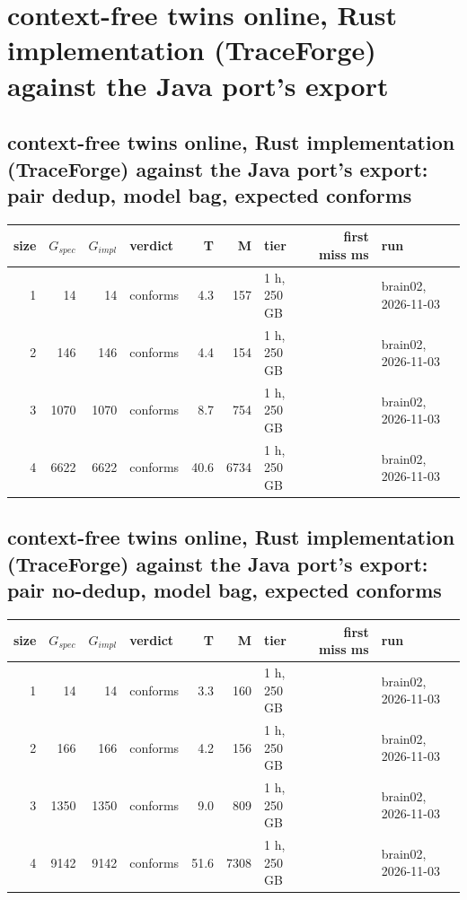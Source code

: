 \documentclass[10pt]{article}
\begin{document}
\section*{context-free twins online, Rust implementation (TraceForge) against the Java port's export}
\subsection*{context-free twins online, Rust implementation (TraceForge) against the Java port's export: pair \textsf{dedup}, model bag, expected conforms}
\begin{longtable}{@{}rrrlrrlrl@{}}
\toprule
size & $G_{\mathit{spec}}$ & $G_{\mathit{impl}}$ & verdict & T & M & tier & first miss ms & run \\
\midrule
\endhead
\color{red} 1 & 14 & 14 & conforms & 4.3 & 157 & 1 h, 250 GB &  & brain02, 2026-11-03 \\
\color{red} 2 & 146 & 146 & conforms & 4.4 & 154 & 1 h, 250 GB &  & brain02, 2026-11-03 \\
\color{red} 3 & 1070 & 1070 & conforms & 8.7 & 754 & 1 h, 250 GB &  & brain02, 2026-11-03 \\
\color{red} 4 & 6622 & 6622 & conforms & 40.6 & 6734 & 1 h, 250 GB &  & brain02, 2026-11-03 \\
\bottomrule
\end{longtable}
\subsection*{context-free twins online, Rust implementation (TraceForge) against the Java port's export: pair \textsf{no-dedup}, model bag, expected conforms}
\begin{longtable}{@{}rrrlrrlrl@{}}
\toprule
size & $G_{\mathit{spec}}$ & $G_{\mathit{impl}}$ & verdict & T & M & tier & first miss ms & run \\
\midrule
\endhead
\color{red} 1 & 14 & 14 & conforms & 3.3 & 160 & 1 h, 250 GB &  & brain02, 2026-11-03 \\
\color{red} 2 & 166 & 166 & conforms & 4.2 & 156 & 1 h, 250 GB &  & brain02, 2026-11-03 \\
\color{red} 3 & 1350 & 1350 & conforms & 9.0 & 809 & 1 h, 250 GB &  & brain02, 2026-11-03 \\
\color{red} 4 & 9142 & 9142 & conforms & 51.6 & 7308 & 1 h, 250 GB &  & brain02, 2026-11-03 \\
\bottomrule
\end{longtable}
\end{document}

